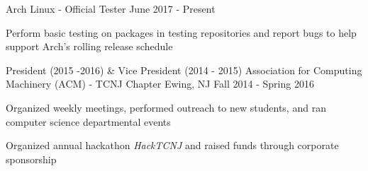 
%
%

\begin{cventries}

  \bproject
    {Arch Linux - Official Tester}
    {June 2017 - Present} %
    {
      \begin{cvitems} %
        \item {Perform basic testing on packages in testing repositories and report bugs to help support Arch's rolling release schedule}
      \end{cvitems}
    }

  \cventry
  {President (2015 -2016) \& Vice President (2014 - 2015)} %
  {Association for Computing Machinery (ACM) - TCNJ Chapter} %
  {Ewing, NJ} %
  {Fall 2014 - Spring 2016} %
  {
    \begin{cvitems} %
    \item {Organized weekly meetings, performed outreach to new students, and ran computer science departmental events}
    \item {Organized annual hackathon \emph{HackTCNJ} and raised funds through corporate sponsorship}
    \end{cvitems}
  }

\end{cventries}
